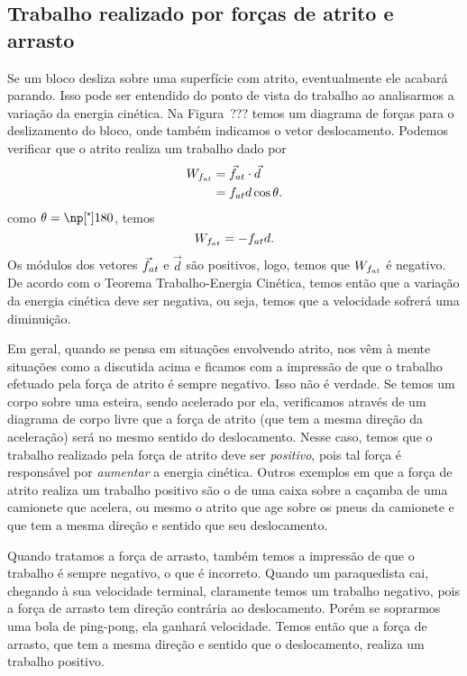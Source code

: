 \subsection{Trabalho realizado por forças de atrito e arrasto}

Se um bloco desliza sobre uma superfície com atrito, eventualmente ele acabará parando. Isso pode ser entendido do ponto de vista do trabalho ao analisarmos a variação da energia cinética. Na Figura~??? temos um diagrama de forças para o deslizamento do bloco, onde também indicamos o vetor deslocamento. Podemos verificar que o atrito realiza um trabalho dado por
\begin{align}
  W_{f_{at}} &= \vec{f}_{at}\cdot\vec{d} \\
  &= f_{at} d\cos\theta.
\end{align}
%
como $\theta = \degree{180}$, temos
\begin{equation}
  W_{f_{at}} = -f_{at} d.
\end{equation}
%
Os módulos dos vetores $\vec{f}_{at}$ e $\vec{d}$ são positivos, logo, temos que $W_{f_{at}}$ é negativo. De acordo com o Teorema Trabalho-Energia Cinética, temos então que a variação da energia cinética deve ser negativa, ou seja, temos que a velocidade sofrerá uma diminuição. 

Em geral, quando se pensa em situações envolvendo atrito, nos vêm à mente situações como a discutida acima e ficamos com a impressão de que o trabalho efetuado pela força de atrito é sempre negativo. Isso não é verdade. Se temos um corpo sobre uma esteira, %
sendo acelerado por ela, verificamos através de um diagrama de corpo livre %
que a força de atrito (que tem a mesma direção da aceleração) será no mesmo sentido do deslocamento. Nesse caso, temos que o trabalho realizado pela força de atrito deve ser \emph{positivo}, pois tal força é responsável por \emph{aumentar} a energia cinética. Outros exemplos em que a força de atrito realiza um trabalho positivo são o de uma caixa sobre a caçamba de uma camionete que acelera, ou mesmo o atrito que age sobre os pneus da camionete e que tem a mesma direção e sentido que seu deslocamento.

Quando tratamos a força de arrasto, também temos a impressão de que o trabalho é sempre negativo, o que é incorreto. Quando um paraquedista cai, chegando à sua velocidade terminal, claramente temos um trabalho negativo, pois a força de arrasto tem direção contrária ao deslocamento. Porém se soprarmos uma bola de ping-pong, ela ganhará velocidade. Temos então que a força de arrasto, que tem a mesma direção e sentido que o deslocamento, realiza um trabalho positivo.

